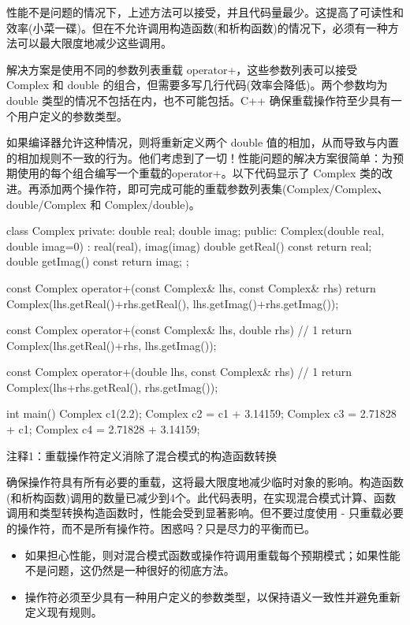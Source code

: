 
性能不是问题的情况下，上述方法可以接受，并且代码量最少。这提高了可读性和效率(小菜一碟)。但在不允许调用构造函数(和析构函数)的情况下，必须有一种方法可以最大限度地减少这些调用。

解决方案是使用不同的参数列表重载 operator+，这些参数列表可以接受 Complex 和 double 的组合，但需要多写几行代码(效率会降低)。两个参数均为 double 类型的情况不包括在内，也不可能包括。C++ 确保重载操作符至少具有一个用户定义的参数类型。

如果编译器允许这种情况，则将重新定义两个 double 值的相加，从而导致与内置的相加规则不一致的行为。他们考虑到了一切！性能问题的解决方案很简单：为预期使用的每个组合编写一个重载的operator+。以下代码显示了 Complex 类的改进。再添加两个操作符，即可完成可能的重载参数列表集(Complex/Complex、double/Complex 和 Complex/double)。


\begin{cpp}
class Complex {
private:
  double real;
  double imag;
public:
  Complex(double real, double imag=0) : real(real), imag(imag) {}
  double getReal() const { return real; }
  double getImag() const { return imag; }
};

const Complex operator+(const Complex& lhs, const Complex& rhs) {
  return Complex(lhs.getReal()+rhs.getReal(), lhs.getImag()+rhs.getImag());
}

const Complex operator+(const Complex& lhs, double rhs) { // 1
  return Complex(lhs.getReal()+rhs, lhs.getImag());
}

const Complex operator+(double lhs, const Complex& rhs) { // 1
  return Complex(lhs+rhs.getReal(), rhs.getImag());
}

int main() {
  Complex c1(2.2);
  Complex c2 = c1 + 3.14159;
  Complex c3 = 2.71828 + c1;
  Complex c4 = 2.71828 + 3.14159;
}
\end{cpp}

{\footnotesize
注释1：重载操作符定义消除了混合模式的构造函数转换
}

确保操作符具有所有必要的重载，这将最大限度地减少临时对象的影响。构造函数(和析构函数)调用的数量已减少到4个。此代码表明，在实现混合模式计算、函数调用和类型转换构造函数时，性能会受到显著影响。但不要过度使用 - 只重载必要的操作符，而不是所有操作符。困惑吗？只是尽力的平衡而已。


\begin{itemize}
\item
如果担心性能，则对混合模式函数或操作符调用重载每个预期模式；如果性能不是问题，这仍然是一种很好的彻底方法。

\item
操作符必须至少具有一种用户定义的参数类型，以保持语义一致性并避免重新定义现有规则。
\end{itemize}
